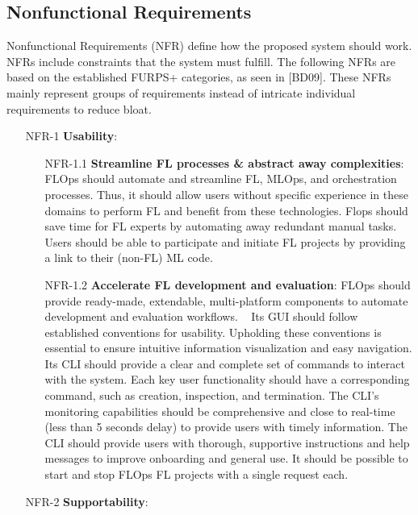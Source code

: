 \subsection{Nonfunctional Requirements}
Nonfunctional Requirements (NFR) define how the proposed system should work.
NFRs include constraints that the system must fulfill.
The following NFRs are based on the established FURPS+ categories, as seen in [BD09].
These NFRs mainly represent groups of requirements instead of intricate individual requirements to reduce bloat.

\begin{itemize}
    \item [NFR-1] {\textbf{Usability}}:
        \begin{itemize}
        \item [NFR-1.1] \textbf{Streamline FL processes \& abstract away complexities}:
            FLOps should automate and streamline FL, MLOps, and orchestration processes.
            Thus, it should allow users without specific experience in these domains to perform FL and benefit from these technologies.
            Flops should save time for FL experts by automating away redundant manual tasks.
            Users should be able to participate and initiate FL projects by providing a link to their (non-FL) ML code.
        \item [NFR-1.2] \textbf{Accelerate FL development and evaluation}: 
            FLOps should provide ready-made, extendable, multi-platform components to automate development and evaluation workflows.  
            Its GUI should follow established conventions for usability.
            Upholding these conventions is essential to ensure intuitive information visualization and easy navigation.
            Its CLI should provide a clear and complete set of commands to interact with the system.
            Each key user functionality should have a corresponding command, such as creation, inspection, and termination.
            The CLI's monitoring capabilities should be comprehensive and close to real-time (less than 5 seconds delay) to provide users with timely information.
            The CLI should provide users with thorough, supportive instructions and help messages to improve onboarding and general use.
            It should be possible to start and stop FLOps FL projects with a single request each.
        \end{itemize}
    \item [NFR-2] {\textbf{Supportability}}:
        \begin{itemize}

\end{itemize}
\end{itemize}
